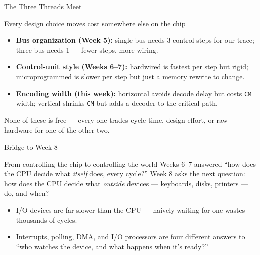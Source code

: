\documentclass[aspectratio=169]{beamer}
\begin{document}
\begin{frame}{The Three Threads Meet}
  \begin{block}{Every design choice moves cost somewhere else on the chip}
    \begin{itemize}
      \item \textbf{Bus organization (Week 5):} single-bus needs 3 control
        steps for our trace; three-bus needs 1 --- fewer steps, more wiring.
      \item \textbf{Control-unit style (Weeks 6--7):} hardwired is fastest per
        step but rigid; microprogrammed is slower per step but just a memory
        rewrite to change.
      \item \textbf{Encoding width (this week):} horizontal avoids decode
        delay but costs \texttt{CM} width; vertical shrinks \texttt{CM} but
        adds a decoder to the critical path.
    \end{itemize}
  \end{block}
  None of these is free --- every one trades cycle time, design effort, or
  raw hardware for one of the other two.
\end{frame}

\begin{frame}{Bridge to Week 8}
  \begin{exampleblock}{From controlling the chip to controlling the world}
    Weeks 6--7 answered ``how does the CPU decide what \emph{itself} does,
    every cycle?'' Week 8 asks the next question: how does the CPU decide
    what \emph{outside} devices --- keyboards, disks, printers --- do, and
    when?
  \end{exampleblock}
  \begin{itemize}
    \item I/O devices are far slower than the CPU --- naively waiting for one
      wastes thousands of cycles.
    \item Interrupts, polling, DMA, and I/O processors are four different
      answers to ``who watches the device, and what happens when it's ready?''
  \end{itemize}
\end{frame}
\end{document}
